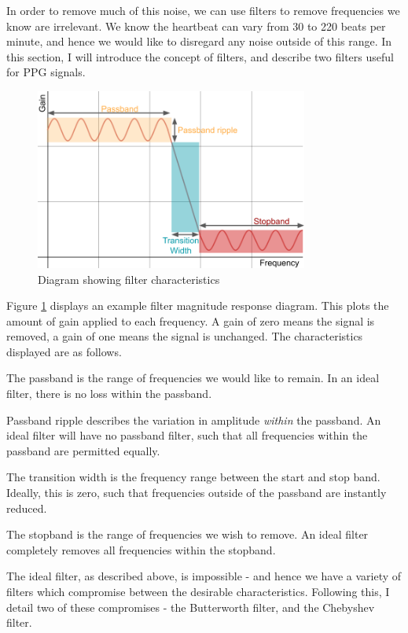 \documentclass[12pt,a4paper,twoside,openright]{report}
\begin{document}
In order to remove much of this noise, we can use filters to remove
frequencies we know are irrelevant. We know the heartbeat can vary from 
30 to 220 beats per minute, and hence we would like to disregard any noise 
outside of this range. In this section, I will introduce the concept of 
filters, and describe two filters useful for PPG signals.

\begin{figure}[h!]
	\centerline{\includegraphics[width=0.8\textwidth]{figs/filter.png}}
\caption{Diagram showing filter characteristics}
\label{fig:filterdiag}
\end{figure}

Figure \ref{fig:filterdiag} displays an example filter magnitude response
diagram. This plots the amount of gain applied to each frequency. A gain of
zero means the signal is removed, a gain of one means the signal is unchanged.
The characteristics displayed are as follows.

The passband is the range of frequencies we would like to remain. In an ideal
filter, there is no loss within the passband.

Passband ripple describes the variation in amplitude \emph{within} the
passband. An ideal filter will have no passband filter, such that all
frequencies within the passband are permitted equally.

The transition width is the frequency range between the start and stop band.
Ideally, this is zero, such that frequencies outside of the passband are
instantly reduced.

The stopband is the range of frequencies we wish to remove. An ideal filter
completely removes all frequencies within the stopband.

The ideal filter, as described above, is impossible - and hence we have a
variety of filters which compromise between the desirable characteristics.
Following this, I detail two of these compromises - the Butterworth filter,
and the Chebyshev filter.
\end{document}
